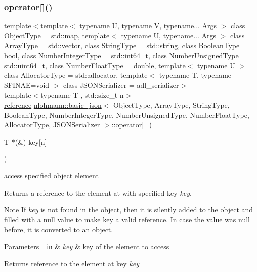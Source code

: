 \subsubsection{\texorpdfstring{operator[]()}{operator[]()}\hspace{0.1cm}{\footnotesize\ttfamily [5/10]}}
{\footnotesize\ttfamily template$<$template$<$ typename U, typename V, typename... Args $>$ class Object\+Type = std\+::map, template$<$ typename U, typename... Args $>$ class Array\+Type = std\+::vector, class String\+Type  = std\+::string, class Boolean\+Type  = bool, class Number\+Integer\+Type  = std\+::int64\+\_\+t, class Number\+Unsigned\+Type  = std\+::uint64\+\_\+t, class Number\+Float\+Type  = double, template$<$ typename U $>$ class Allocator\+Type = std\+::allocator, template$<$ typename T, typename S\+F\+I\+N\+A\+E=void $>$ class J\+S\+O\+N\+Serializer = adl\+\_\+serializer$>$ \\
template$<$typename T , std\+::size\+\_\+t n$>$ \\
\mbox{\hyperlink{classnlohmann_1_1basic__json_ac6a5eddd156c776ac75ff54cfe54a5bc}{reference}} \mbox{\hyperlink{classnlohmann_1_1basic__json}{nlohmann\+::basic\+\_\+json}}$<$ Object\+Type, Array\+Type, String\+Type, Boolean\+Type, Number\+Integer\+Type, Number\+Unsigned\+Type, Number\+Float\+Type, Allocator\+Type, J\+S\+O\+N\+Serializer $>$\+::operator\mbox{[}$\,$\mbox{]} (\begin{DoxyParamCaption}\item[{T $\ast$(\&)}]{key\mbox{[}n\mbox{]} }\end{DoxyParamCaption})\hspace{0.3cm}{\ttfamily [inline]}}



access specified object element 

Returns a reference to the element at with specified key {\itshape key}.

\begin{DoxyNote}{Note}
If {\itshape key} is not found in the object, then it is silently added to the object and filled with a {\ttfamily null} value to make {\ttfamily key} a valid reference. In case the value was {\ttfamily null} before, it is converted to an object.
\end{DoxyNote}

\begin{DoxyParams}[1]{Parameters}
\mbox{\texttt{ in}}  & {\em key} & key of the element to access\\
\hline
\end{DoxyParams}
\begin{DoxyReturn}{Returns}
reference to the element at key {\itshape key} 
\end{DoxyReturn}

